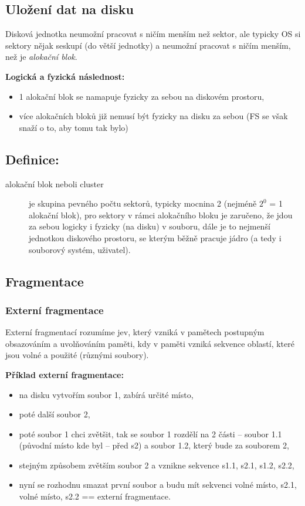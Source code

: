 \documentclass[a4paper, 11pt]{article}
\begin{document}
\subsection{Uložení dat na disku}
Disková jednotka neumožní pracovat s ničím menším než sektor, ale typicky OS si sektory nějak seskupí (do větší jednotky) a neumožní pracovat s ničím menším, než je \emph{alokační blok}.
 
\textbf{Logická a fyzická následnost:}
\begin{itemize}
    \item 1 alokační blok se namapuje fyzicky za sebou na diskovém prostoru,
    \item více alokačních bloků již nemusí být fyzicky na disku za sebou (FS se však snaží o to, aby tomu tak bylo)
\end{itemize}
 
\subsection*{Definice:}
\begin{description}
\item[alokační blok neboli cluster] je skupina pevného počtu sektorů, typicky mocnina 2 (nejméně $2^0$ = 1 alokační blok), pro sektory v rámci alokačního bloku je zaručeno, že jdou za sebou logicky i fyzicky (na disku) v souboru, dále je to nejmenší jednotkou  diskového prostoru, se kterým běžně pracuje jádro (a tedy i souborový systém, uživatel).
\end{description}


\subsection{Fragmentace}
\subsubsection{Externí fragmentace}
Externí fragmentací rozumíme jev, který vzniká v pamětech postupným obsazováním a uvolňováním paměti, kdy v paměti vzniká sekvence oblastí, které jsou volné a použité (různými soubory).
 
\textbf{Příklad externí fragmentace:}
\begin{itemize}
    \item na disku vytvořím soubor 1, zabírá určité místo,
    \item poté další soubor 2,
    \item poté soubor 1 chci zvětšit, tak se soubor 1 rozdělí na 2 části -- soubor 1.1 (původní místo kde byl -- před s2) a soubor 1.2, který bude za souborem 2,
    \item stejným způsobem zvětším soubor 2 a vznikne sekvence s1.1, s2.1, s1.2, s2.2,
    \item nyní se rozhodnu smazat první soubor a budu mít sekvenci volné místo, s2.1, volné místo, s2.2 == externí fragmentace.
\end{itemize}
 
\end{document}
